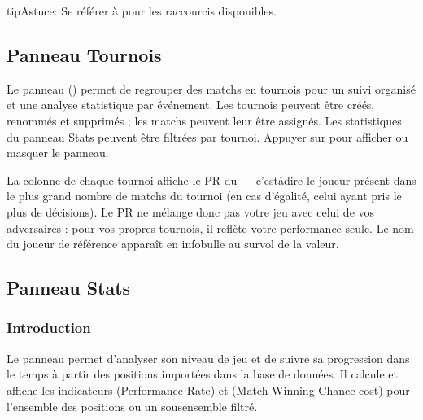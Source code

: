 \documentclass[letterpaper,10pt,french]{sphinxmanual}
\begin{document}
\begin{sphinxadmonition}{tip}{Astuce:}
\sphinxAtStartPar
Se référer à {\hyperref[\detokenize{raccourcis:raccourcis}]{}} pour les raccourcis disponibles.
\end{sphinxadmonition}


\subsection{Panneau Tournois}
\label{\detokenize{manuel:panneau-tournois}}\label{\detokenize{manuel:id8}}
\sphinxAtStartPar
Le panneau  () permet de regrouper des matchs en tournois
pour un suivi organisé et une analyse statistique par événement. Les tournois
peuvent être créés, renommés et supprimés ; les matchs peuvent leur être
assignés. Les statistiques du panneau Stats peuvent être filtrées par tournoi.
Appuyer sur  pour afficher ou masquer le panneau.

\sphinxAtStartPar
La colonne  de chaque tournoi affiche le PR du  —
c’est\sphinxhyphen{}à\sphinxhyphen{}dire le joueur présent dans le plus grand nombre de matchs du tournoi
(en cas d’égalité, celui ayant pris le plus de décisions). Le PR ne mélange donc
pas votre jeu avec celui de vos adversaires : pour vos propres tournois, il
reflète votre performance seule. Le nom du joueur de référence apparaît en
infobulle au survol de la valeur.


\subsection{Panneau Stats}
\label{\detokenize{manuel:panneau-stats}}\label{\detokenize{manuel:stats}}

\subsubsection{Introduction}
\label{\detokenize{manuel:id9}}
\sphinxAtStartPar
Le panneau  permet d’analyser son niveau de jeu et de suivre sa
progression dans le temps à partir des positions importées dans la base de
données. Il calcule et affiche les indicateurs  (Performance Rate) et
 (Match Winning Chance cost) pour l’ensemble des positions ou un
sous\sphinxhyphen{}ensemble filtré.
\end{document}
